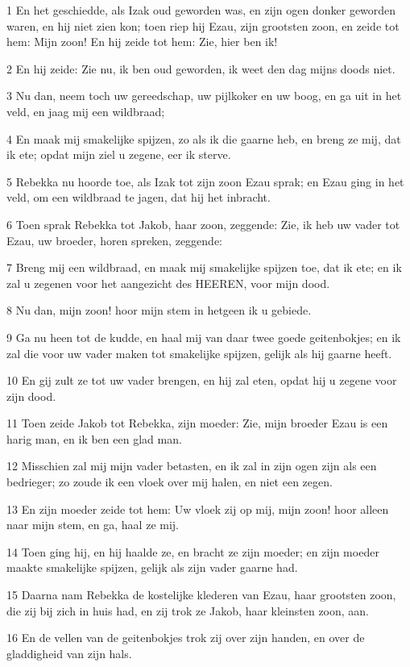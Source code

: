 \par 1 En het geschiedde, als Izak oud geworden was, en zijn ogen donker geworden waren, en hij niet zien kon; toen riep hij Ezau, zijn grootsten zoon, en zeide tot hem: Mijn zoon! En hij zeide tot hem: Zie, hier ben ik!
\par 2 En hij zeide: Zie nu, ik ben oud geworden, ik weet den dag mijns doods niet.
\par 3 Nu dan, neem toch uw gereedschap, uw pijlkoker en uw boog, en ga uit in het veld, en jaag mij een wildbraad;
\par 4 En maak mij smakelijke spijzen, zo als ik die gaarne heb, en breng ze mij, dat ik ete; opdat mijn ziel u zegene, eer ik sterve.
\par 5 Rebekka nu hoorde toe, als Izak tot zijn zoon Ezau sprak; en Ezau ging in het veld, om een wildbraad te jagen, dat hij het inbracht.
\par 6 Toen sprak Rebekka tot Jakob, haar zoon, zeggende: Zie, ik heb uw vader tot Ezau, uw broeder, horen spreken, zeggende:
\par 7 Breng mij een wildbraad, en maak mij smakelijke spijzen toe, dat ik ete; en ik zal u zegenen voor het aangezicht des HEEREN, voor mijn dood.
\par 8 Nu dan, mijn zoon! hoor mijn stem in hetgeen ik u gebiede.
\par 9 Ga nu heen tot de kudde, en haal mij van daar twee goede geitenbokjes; en ik zal die voor uw vader maken tot smakelijke spijzen, gelijk als hij gaarne heeft.
\par 10 En gij zult ze tot uw vader brengen, en hij zal eten, opdat hij u zegene voor zijn dood.
\par 11 Toen zeide Jakob tot Rebekka, zijn moeder: Zie, mijn broeder Ezau is een harig man, en ik ben een glad man.
\par 12 Misschien zal mij mijn vader betasten, en ik zal in zijn ogen zijn als een bedrieger; zo zoude ik een vloek over mij halen, en niet een zegen.
\par 13 En zijn moeder zeide tot hem: Uw vloek zij op mij, mijn zoon! hoor alleen naar mijn stem, en ga, haal ze mij.
\par 14 Toen ging hij, en hij haalde ze, en bracht ze zijn moeder; en zijn moeder maakte smakelijke spijzen, gelijk als zijn vader gaarne had.
\par 15 Daarna nam Rebekka de kostelijke klederen van Ezau, haar grootsten zoon, die zij bij zich in huis had, en zij trok ze Jakob, haar kleinsten zoon, aan.
\par 16 En de vellen van de geitenbokjes trok zij over zijn handen, en over de gladdigheid van zijn hals.
